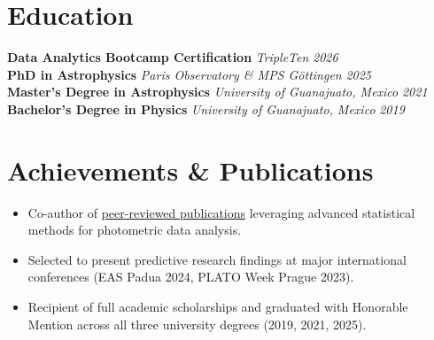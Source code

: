 \documentclass[10pt,a4paper]{article}
\begin{document}
\section*{Education}
\textbf{Data Analytics Bootcamp Certification} \hfill \textit{TripleTen} \hfill \textit{2026}\\
\textbf{PhD in Astrophysics} \hfill \textit{Paris Observatory \& MPS Göttingen} \hfill \textit{2025}\\
\textbf{Master's Degree in Astrophysics} \hfill \textit{University of Guanajuato, Mexico} \hfill \textit{2021}\\
\textbf{Bachelor's Degree in Physics} \hfill \textit{University of Guanajuato, Mexico} \hfill \textit{2019}

\section*{Achievements \& Publications}
\begin{itemize}[leftmargin=1.5em]
    \item Co-author of \href{https://ui.adsabs.harvard.edu/search/fq...}{peer-reviewed publications} leveraging advanced statistical methods for photometric data analysis.
    \item Selected to present predictive research findings at major international conferences (EAS Padua 2024, PLATO Week Prague 2023).
    \item Recipient of full academic scholarships and graduated with Honorable Mention across all three university degrees (2019, 2021, 2025).
\end{itemize}
\end{document}
